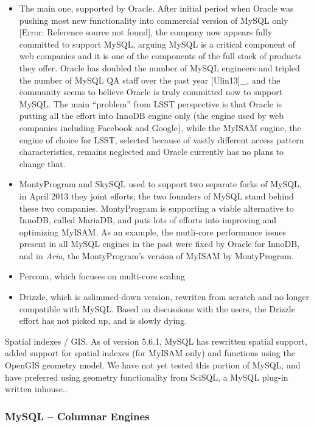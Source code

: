 \documentclass[DM,lsstdraft,toc]{lsstdoc}
\begin{document}
\begin{itemize}
\item
  The main one, supported by Oracle. After initial period when Oracle
  was pushing most new functionality into commercial version of MySQL
  only {[}Error: Reference source not found{]}, the company now appears
  fully committed to support MySQL, arguing MySQL is a critical
  component of web companies and it is one of the components of the full
  stack of products they offer. Oracle has doubled the number of MySQL
  engineers and tripled the number of MySQL QA staff over the past year
  {[}Ulin13{]}\_, and the community seems to believe Oracle is truly
  committed now to support MySQL. The main ``problem'' from LSST
  perspective is that Oracle is putting all the effort into InnoDB
  engine only (the engine used by web companies including Facebook and
  Google), while the MyISAM engine, the engine of choice for LSST,
  selected because of vastly different access pattern characteristics,
  remains neglected and Oracle currently has no plans to change that.
\item
  MontyProgram and SkySQL used to support two separate forks of MySQL,
  in April 2013 they joint efforts; the two founders of MySQL stand
  behind these two companies. MontyProgram is supporting a viable
  alternative to InnoDB, called MariaDB, and puts lots of efforts into
  improving and optimizing MyISAM. As an example, the mutli-core
  performance issues present in all MySQL engines in the past were fixed
  by Oracle for InnoDB, and in \emph{Aria}, the MontyProgram's version
  of MyISAM by MontyProgram.
\item
  Percona, which focuses on multi-core scaling
\item
  Drizzle, which is aslimmed-down version,
  rewriten from scratch and no longer compatible with MySQL. Based on
  discussions with the users, the Drizzle
  effort has not picked up, and is slowly dying.
\end{itemize}

Spatial indexes / GIS. As of version 5.6.1, MySQL has rewritten spatial
support, added support for spatial indexes (for MyISAM only) and
functions using the OpenGIS geometry model. We have not yet tested this
portion of MySQL, and have preferred using geometry functionality from
SciSQL, a MySQL plug-in written inhouse..

\subsubsection{MySQL -- Columnar Engines}\label{mysql-columnar-engines}
\end{document}
